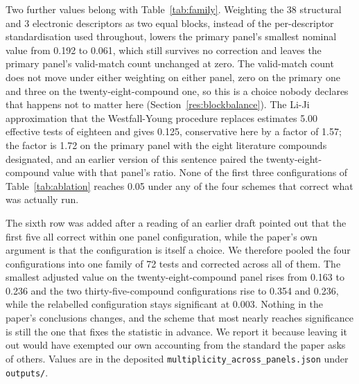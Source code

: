 \documentclass[11pt,a4paper]{article}
\begin{document}
Two further values belong with Table~\ref{tab:family}. Weighting the 38
structural and 3 electronic descriptors as two equal blocks, instead of the
per-descriptor standardisation used throughout, lowers the primary panel's
smallest nominal value from 0.192 to 0.061, which still survives no correction
and leaves the primary panel's valid-match count unchanged at zero. The
valid-match count does not move under either weighting on either panel, zero on
the primary one and three on the twenty-eight-compound one, so this is a choice
nobody declares that happens not to matter here
(Section~\ref{res:blockbalance}).
The Li-Ji approximation that the Westfall-Young procedure replaces estimates
5.00 effective tests of eighteen and gives 0.125, conservative here by a factor
of 1.57; the factor is 1.72 on the primary panel with the eight literature
compounds designated, and an earlier version of this sentence paired the
twenty-eight-compound value with that panel's ratio. None of the first three configurations of Table~\ref{tab:ablation}
reaches 0.05 under any of the four schemes that correct what was actually run.

\begin{table}[!htb]
\centering
\caption{Six ways of accounting for the search, applied to the eighteen tests
of each panel configuration. The Westfall-Young min-$P$ value
\cite{westfall1993} is exact for the dependence among the tests, since all
eighteen share one enumeration of designations; $m_{\mathrm{eff}}$ approximates
that dependence from the eigenvalues of the correlation matrix of the eighteen
nulls \cite{liji2005}, used as a Bonferroni divisor. On the primary panel no
scheme returns anything below 0.05 and on the smaller panel only the
pre-specified-statistic scheme does, while the fourth configuration, which
differs from the second by two class labels, is below 0.05 under every scheme.}
\label{tab:family}
\small
\setlength{\tabcolsep}{4pt}

\end{table}

The sixth row was added after a reading of an earlier draft pointed out that
the first five all correct within one panel configuration, while the paper's own
argument is that the configuration is itself a choice. We therefore pooled the
four configurations into one family of 72 tests and corrected across all of
them. The smallest adjusted value on the twenty-eight-compound panel rises from
0.163 to 0.236 and the two thirty-five-compound configurations rise to 0.354 and
0.236, while the relabelled configuration stays significant at 0.003. Nothing in
the paper's conclusions changes, and the scheme that most nearly reaches
significance is still the one that fixes the statistic in advance. We report it
because leaving it out would have exempted our own accounting from the standard
the paper asks of others. Values are in the deposited
\texttt{multiplicity\_across\_panels.json} under \texttt{outputs/}.
\end{document}
